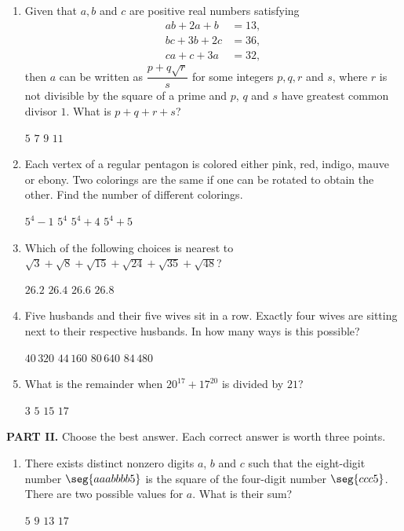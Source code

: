 \documentclass[11pt,paper=letter]{scrartcl}
\begin{document}
\begin{enumerate}[start=11]
  \item Given that $a, b$ and $c$ are positive real numbers satisfying
  \begin{align*}
    ab + 2a + b &= 13,\\
    bc + 3b + 2c &= 36,\\
    ca + c + 3a &= 32,
  \end{align*}
  then $a$ can be written as $\dfrac{p + q\sqrt{r}}s$ for some integers $p, q, r$ and $s$, where $r$ is not divisible by the square of a prime and $p$, $q$ and $s$ have greatest common divisor $1$. What is $p + q + r + s$?

  \fourch
  {$5$}
  {$7$}
  {$9$}
  {$11$}

  \item Each vertex of a regular pentagon is colored either pink, red, indigo, mauve or ebony. Two colorings are the same if one can be rotated to obtain the other. Find the number of different colorings.

  \fourch
  {$5^4 - 1$}
  {$5^4$}
  {$5^4 + 4$}
  {$5^4 + 5$}

  \item Which of the following choices is nearest to $\sqrt{3} + \sqrt{8} + \sqrt{15} + \sqrt{24} + \sqrt{35} + \sqrt{48}$?

  \fourch
  {$26.2$}
  {$26.4$}
  {$26.6$}
  {$26.8$}

  \item Five husbands and their five wives sit in a row. Exactly four wives are sitting next to their respective husbands. In how many ways is this possible?

  \fourch
  {$40\,320$}
  {$44\,160$}
  {$80\,640$}
  {$84\,480$}

  \item What is the remainder when $20^{17} + 17^{20}$ is divided by $21$?

  \fourch
  {$3$}
  {$5$}
  {$15$}
  {$17$}
\end{enumerate}

\vspace{1em}
\noindent\textbf{PART II.} Choose the best answer. Each correct answer is worth three points.

\begin{enumerate}
  \item There exists distinct nonzero digits $a$, $b$ and $c$ such that the eight-digit number $\seg{aaabbbb5}$ is the square of the four-digit number $\seg{ccc5}$. There are two possible values for $a$. What is their sum?

  \fourch
  {$5$}
  {$9$}
  {$13$}
  {$17$}
\end{enumerate}
\end{document}
